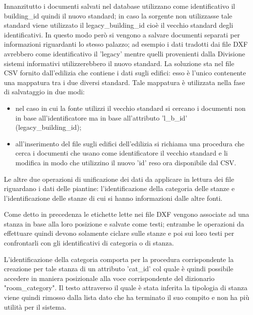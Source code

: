 \documentclass[12pt]{report}
\begin{document}
Innanzitutto i documenti salvati nel database utilizzano come identificativo il building\_id quindi il nuovo standard; in caso la sorgente non utilizzasse tale standard viene utilizzato il legacy\_building\_id cioè il vecchio standard degli identificativi.
In questo modo però si vengono a salvare documenti separati per informazioni riguardanti lo stesso palazzo; ad esempio i dati tradotti dai file DXF avrebbero come identificativo il 'legacy' mentre quelli provenienti dalla Divisione sistemi informativi utilizzerebbero il nuovo standard.
La soluzione sta nel file CSV fornito dall'edilizia che contiene i dati sugli edifici: esso è l'unico contenente una mappatura tra i due diversi standard.
Tale mappatura è utilizzata nella fase di salvataggio in due modi:
\begin{itemize}
\item nel caso in cui la fonte utilizzi il vecchio standard si cercano i documenti non in base all'identificatore ma in base all'attributo 'l\_b\_id' (legacy\_building\_id);
\item all'inserimento del file sugli edifici dell'edilizia si richiama una procedura che cerca i documenti che usano come identificatore il vecchio standard e li modifica in modo che utilizzino il nuovo 'id' reso ora disponibile dal CSV. 
\end{itemize} 

\vspace{5mm} %

Le altre due operazioni di unificazione dei dati da applicare in lettura dei file riguardano i dati delle piantine: l'identificazione della categoria delle stanze e l'identificazione delle stanze di cui si hanno informazioni dalle altre fonti.

Come detto in precedenza le etichette lette nei file DXF vengono associate ad una stanza in base alla loro posizione e salvate come testi; entrambe le operazioni da effettuare quindi devono solamente ciclare sulle stanze e poi sui loro testi per confrontarli con gli identificativi di categoria o di stanza.

L'identificazione della categoria comporta per la procedura corrispondente la creazione per tale stanza di un attributo 'cat\_id' col quale è quindi possibile accedere in maniera posizionale alla voce corrispondente del dizionario "room\_category". 
Il testo attraverso il quale è stata inferita la tipologia di stanza viene quindi rimosso dalla lista dato che ha terminato il suo compito e non ha più utilità per il sistema.
\end{document}
